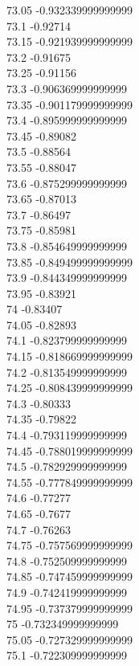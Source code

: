 {73.05	-0.932339999999999\\
73.1	-0.92714\\
73.15	-0.921939999999999\\
73.2	-0.91675\\
73.25	-0.91156\\
73.3	-0.906369999999999\\
73.35	-0.901179999999999\\
73.4	-0.895999999999999\\
73.45	-0.89082\\
73.5	-0.88564\\
73.55	-0.88047\\
73.6	-0.875299999999999\\
73.65	-0.87013\\
73.7	-0.86497\\
73.75	-0.85981\\
73.8	-0.854649999999999\\
73.85	-0.849499999999999\\
73.9	-0.844349999999999\\
73.95	-0.83921\\
74	-0.83407\\
74.05	-0.82893\\
74.1	-0.823799999999999\\
74.15	-0.818669999999999\\
74.2	-0.813549999999999\\
74.25	-0.808439999999999\\
74.3	-0.80333\\
74.35	-0.79822\\
74.4	-0.793119999999999\\
74.45	-0.788019999999999\\
74.5	-0.782929999999999\\
74.55	-0.777849999999999\\
74.6	-0.77277\\
74.65	-0.7677\\
74.7	-0.76263\\
74.75	-0.757569999999999\\
74.8	-0.752509999999999\\
74.85	-0.747459999999999\\
74.9	-0.742419999999999\\
74.95	-0.737379999999999\\
75	-0.732349999999999\\
75.05	-0.727329999999999\\
75.1	-0.722309999999999\\
}
